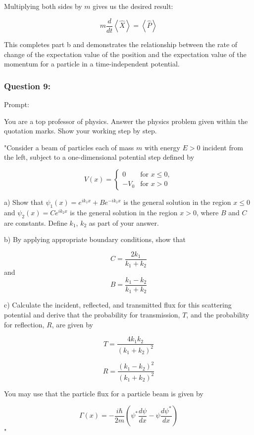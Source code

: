 \documentclass[a4paper,11pt]{article}
\begin{document}
Multiplying both sides by \(m\) gives us the desired result:

\[
m\frac{d}{dt}\left<\hat{X}\right> = \left<\hat{P}\right>
\]

This completes part b and demonstrates the relationship between the rate of change of the expectation value of the position and the expectation value of the momentum for a particle in a time-independent potential.


\subsubsection*{Question 9:}

Prompt:
\begin{spverbatim}
    You are a top professor of physics. Answer the physics problem given within the quotation marks. Show your working step by step.

    "Consider a beam of particles each of mass \( m \) with energy \( E > 0 \) incident from the left, subject to a one-dimensional potential step defined by

    \[ V(x) = \begin{cases}
    0 & \text{for } x \leq 0,\\
    -V_{0}  & \text{for } x > 0 
    \end{cases} \]

    a) Show that \( \psi_{1}(x) = e^{ik_{1}x} + Be^{-ik_{1}x} \) is the general solution in the region \( x \leq 0 \) and \( \psi_{2}(x) = Ce^{ik_{2}x} \) is the general solution in the region \( x > 0 \), where \( B \) and \( C \) are constants. Define \( k_{1} \), \( k_{2} \) as part of your answer.

    b) By applying appropriate boundary conditions, show that 

    \[ C = \frac{2k_{1}}{k_{1}+k_{2}} \] and \[ B = \frac{k_{1}-k_{2}}{k_{1}+k_{2}} \]

    c) Calculate the incident, reflected, and transmitted flux for this scattering potential and derive that the probability for transmission, \( T \), and the probability for reflection, \( R \), are given by 

    \[ T = \frac{4k_{1}k_{2}}{(k_{1}+k_{2})^{2}} \]

    \[ R = \frac{(k_{1}-k_{2})^{2}}{(k_{1}+k_{2})^{2}} \]

    You may use that the particle flux for a particle beam is given by 

    \[ \Gamma(x) = -\frac{i\hbar}{2m} \left(\psi^{*}\frac{d\psi}{dx} - \psi\frac{d\psi^{*}}{dx} \right) \]"
\end{spverbatim}
\end{document}
